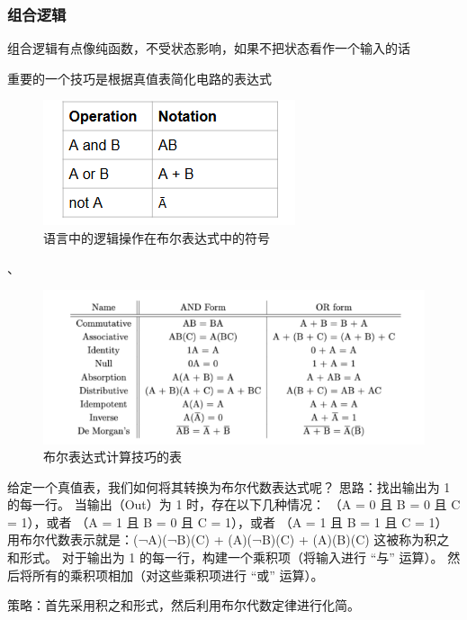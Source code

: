 \documentclass{ctexart}
\begin{document}
\subsubsection{组合逻辑}
组合逻辑有点像纯函数，不受状态影响，如果不把状态看作一个输入的话\par
重要的一个技巧是根据真值表简化电路的表达式\par
\begin{figure}
    \centering
    \includegraphics[width=0.5\linewidth]{语言中的逻辑操作在布尔表达式中的符号.png}
    \caption{语言中的逻辑操作在布尔表达式中的符号}
    \label{fig:enter-label}
\end{figure}
、
\begin{figure}
    \centering
    \includegraphics[width=0.5\linewidth]{布尔表达式的表.png}
    \caption{布尔表达式计算技巧的表}
    \label{fig:enter-label}
\end{figure}
给定一个真值表，我们如何将其转换为布尔代数表达式呢？
思路：找出输出为 1 的每一行。
当输出（Out）为 1 时，存在以下几种情况：
（A = 0 且 B = 0 且 C = 1），或者
（A = 1 且 B = 0 且 C = 1），或者
（A = 1 且 B = 1 且 C = 1）
用布尔代数表示就是：(¬A)(¬B)(C) + (A)(¬B)(C) + (A)(B)(C)
这被称为积之和形式。
对于输出为 1 的每一行，构建一个乘积项（将输入进行 “与” 运算）。
然后将所有的乘积项相加（对这些乘积项进行 “或” 运算）。

策略：首先采用积之和形式，然后利用布尔代数定律进行化简。
\end{document}
